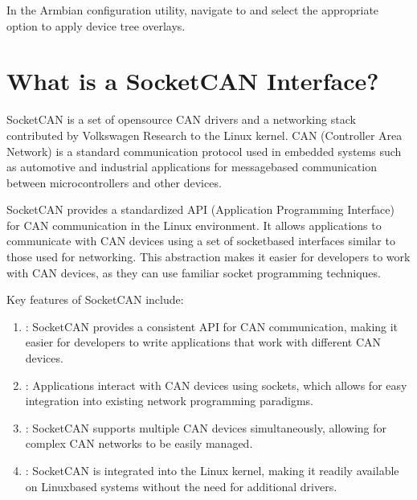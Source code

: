 \documentclass[letterpaper,10pt,english]{sphinxmanual}
\begin{document}
\sphinxAtStartPar
In the Armbian configuration utility, navigate to  and select the appropriate option to apply device tree overlays.


\chapter{What is a SocketCAN Interface?}
\label{\detokenize{socketcan:what-is-a-socketcan-interface}}\label{\detokenize{socketcan::doc}}
\sphinxAtStartPar
SocketCAN is a set of open\sphinxhyphen{}source CAN drivers and a networking stack contributed by Volkswagen Research to the Linux kernel. CAN (Controller Area Network) is a standard communication protocol used in embedded systems such as automotive and industrial applications for message\sphinxhyphen{}based communication between microcontrollers and other devices.

\sphinxAtStartPar
SocketCAN provides a standardized API (Application Programming Interface) for CAN communication in the Linux environment. It allows applications to communicate with CAN devices using a set of socket\sphinxhyphen{}based interfaces similar to those used for networking. This abstraction makes it easier for developers to work with CAN devices, as they can use familiar socket programming techniques.

\sphinxAtStartPar
Key features of SocketCAN include:
\begin{enumerate}
%
\item {} 
\sphinxAtStartPar
{}: SocketCAN provides a consistent API for CAN communication, making it easier for developers to write applications that work with different CAN devices.

\item {} 
\sphinxAtStartPar
{}: Applications interact with CAN devices using sockets, which allows for easy integration into existing network programming paradigms.

\item {} 
\sphinxAtStartPar
{}: SocketCAN supports multiple CAN devices simultaneously, allowing for complex CAN networks to be easily managed.

\item {} 
\sphinxAtStartPar
{}: SocketCAN is integrated into the Linux kernel, making it readily available on Linux\sphinxhyphen{}based systems without the need for additional drivers.

\end{enumerate}
\end{document}
